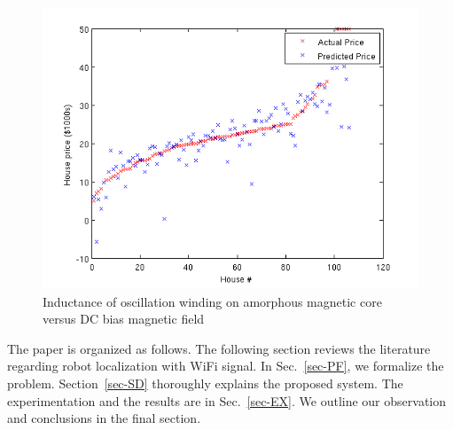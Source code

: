 \documentclass[letterpaper, 10 pt, conference]{ieeeconf}  %
\begin{document}
  \begin{figure}[thpb]
     \centering
     \includegraphics[scale=0.4]{figures/sample_figure.png}
     \caption{Inductance of oscillation winding on amorphous
      magnetic core versus DC bias magnetic field}
      \label{fig-sample}
  \end{figure}
  The paper is organized as follows.
  The following section reviews the literature regarding robot localization with WiFi signal.
  In Sec.~\ref{sec-PF}, we formalize the problem.
  Section~\ref{sec-SD} thoroughly explains the proposed system.
  The experimentation and the results are  in Sec.~\ref{sec-EX}.
  We outline our observation and conclusions in the final section.

%
%
%
\end{document}

